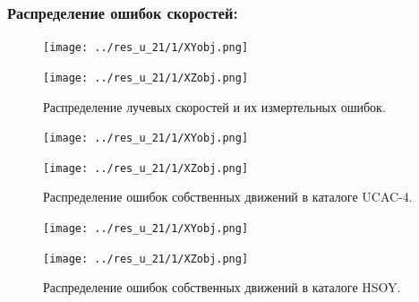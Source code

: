 \documentclass{matmex-diploma-custom}
\begin{document}
\subsubsection*{Распределение ошибок скоростей:}
\begin{figure}[h!]
\caption{Распределение лучевых скоростей и их измертельных ошибок.}
\begin{minipage}[h]{0.49\linewidth}
        \texttt{[image: ../res\_u\_21/1/XYobj.png]}
\end{minipage}
\hfill
\begin{minipage}[h]{0.49\linewidth}
        \texttt{[image: ../res\_u\_21/1/XZobj.png]}
\end{minipage}
\end{figure}

\begin{figure}[h!]
\caption{Распределение ошибок собственных движений в каталоге UCAC-4.}
\begin{minipage}[h]{0.49\linewidth}
        \texttt{[image: ../res\_u\_21/1/XYobj.png]}
\end{minipage}
\hfill
\begin{minipage}[h]{0.49\linewidth}
        \texttt{[image: ../res\_u\_21/1/XZobj.png]}
\end{minipage}
\end{figure}

\begin{figure}[h!]
\caption{Распределение ошибок собственных движений в каталоге HSOY.}
\begin{minipage}[h]{0.49\linewidth}
        \texttt{[image: ../res\_u\_21/1/XYobj.png]}
\end{minipage}
\hfill
\begin{minipage}[h]{0.49\linewidth}
        \texttt{[image: ../res\_u\_21/1/XZobj.png]}
\end{minipage}
\end{figure}

\pagebreak
\end{document}
